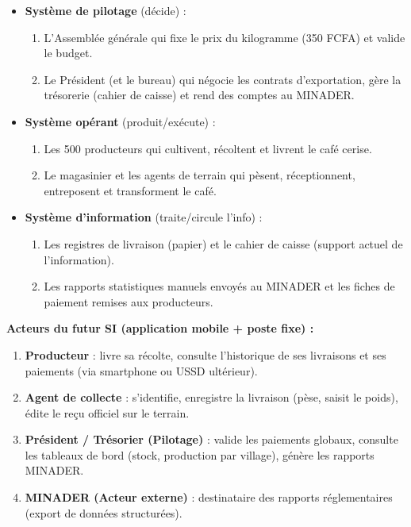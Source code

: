 \documentclass[11pt]{article}
\begin{document}
\begin{exoresolu}
\begin{itemize}
\item \textbf{Système de pilotage} (décide) : 
      \begin{enumerate}
      \item L'Assemblée générale qui fixe le prix du kilogramme (350 FCFA) et valide le budget.
      \item Le Président (et le bureau) qui négocie les contrats d'exportation, gère la trésorerie (cahier de caisse) et rend des comptes au MINADER.
      \end{enumerate}
\item \textbf{Système opérant} (produit/exécute) : 
      \begin{enumerate}
      \item Les \num{500} producteurs qui cultivent, récoltent et livrent le café cerise.
      \item Le magasinier et les agents de terrain qui pèsent, réceptionnent, entreposent et transforment le café.
      \end{enumerate}
\item \textbf{Système d'information} (traite/circule l'info) : 
      \begin{enumerate}
      \item Les registres de livraison (papier) et le cahier de caisse (support actuel de l'information).
      \item Les rapports statistiques manuels envoyés au MINADER et les fiches de paiement remises aux producteurs.
      \end{enumerate}
\end{itemize}

\textbf{Acteurs du futur SI (application mobile + poste fixe) :}
\begin{enumerate}
\item \textbf{Producteur} : livre sa récolte, consulte l'historique de ses livraisons et ses paiements (via smartphone ou USSD ultérieur).
\item \textbf{Agent de collecte} : s'identifie, enregistre la livraison (pèse, saisit le poids), édite le reçu officiel sur le terrain.
\item \textbf{Président / Trésorier (Pilotage)} : valide les paiements globaux, consulte les tableaux de bord (stock, production par village), génère les rapports MINADER.
\item \textbf{MINADER (Acteur externe)} : destinataire des rapports réglementaires (export de données structurées).
\end{enumerate}


\end{exoresolu}
\end{document}
